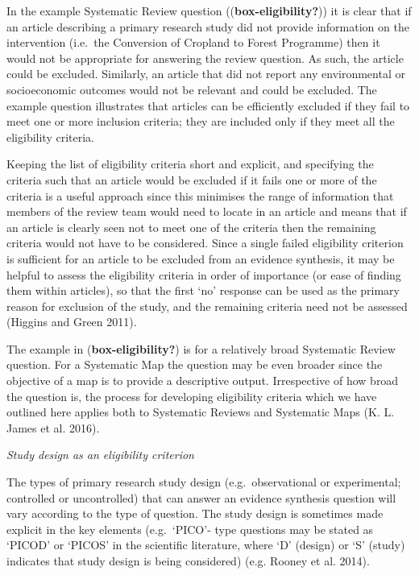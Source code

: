 \documentclass[
  letterpaper,
  DIV=11,
  numbers=noendperiod]{scrreprt}
\begin{document}
In the example Systematic Review question ((\textbf{box-eligibility?}))
it is clear that if an article describing a primary research study did
not provide information on the intervention (i.e.~the Conversion of
Cropland to Forest Programme) then it would not be appropriate for
answering the review question. As such, the article could be excluded.
Similarly, an article that did not report any environmental or
socioeconomic outcomes would not be relevant and could be excluded. The
example question illustrates that articles can be efficiently excluded
if they fail to meet one or more inclusion criteria; they are included
only if they meet all the eligibility criteria.

Keeping the list of eligibility criteria short and explicit, and
specifying the criteria such that an article would be excluded if it
fails one or more of the criteria is a useful approach since this
minimises the range of information that members of the review team would
need to locate in an article and means that if an article is clearly
seen not to meet one of the criteria then the remaining criteria would
not have to be considered. Since a single failed eligibility criterion
is sufficient for an article to be excluded from an evidence synthesis,
it may be helpful to assess the eligibility criteria in order of
importance (or ease of finding them within articles), so that the first
`no' response can be used as the primary reason for exclusion of the
study, and the remaining criteria need not be assessed (Higgins and
Green 2011).

The example in (\textbf{box-eligibility?}) is for a relatively broad
Systematic Review question. For a Systematic Map the question may be
even broader since the objective of a map is to provide a descriptive
output. Irrespective of how broad the question is, the process for
developing eligibility criteria which we have outlined here applies both
to Systematic Reviews and Systematic Maps (K. L. James et al. 2016).

\emph{Study design as an eligibility criterion}

The types of primary research study design (e.g.~observational or
experimental; controlled or uncontrolled) that can answer an evidence
synthesis question will vary according to the type of question. The
study design is sometimes made explicit in the key elements
(e.g.~`PICO'- type questions may be stated as `PICOD' or `PICOS' in the
scientific literature, where `D' (design) or `S' (study) indicates that
study design is being considered) (e.g. Rooney et al. 2014).
\end{document}
